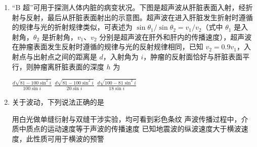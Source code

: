 \documentclass[\gkver]{gaokaozhenti}
\begin{document}
\begin{enumerate}
\fourchoices[answer=A]
{$2.0\UV$}
{$9.0\UV$}
{$12.7\UV$}
{$144.0\UV$}


\item
“B 超”可用于探测人体内脏的病变状况。下图是超声波从肝脏表面入射，经折射与反射，最后从肝脏表面射出的示意图。超声波在进入肝脏发生折射时遵循的规律与光的折射规律类似，可表述为 $\sin\theta_{1}/\sin\theta_{2}=v_{1}/v_{2}$（式中 $\theta_{1}$ 是入射角，$\theta_{2}$ 是折射角，$v_{1}$、$v_{2}$ 分别是超声波在肝外和肝内的传播速度），超声波在肿瘤表面发生反射时遵循的规律与光的反射规律相同，已知 $v_{2}=0.9v_{1}$，入射点与出射点之间的距离是 $d$，入射角为 $i$，肿瘤的反射面恰好与肝脏表面平行，则肿瘤离肝脏表面的深度 $h$ 为

\onepicture[w=3.58cm]{}

{$\frac{d\sqrt{81-100\sin^{2}i}}{100\sin i}$}
{$\frac{d\sqrt{81-100\sin^{2}i}}{20\sin i}$}
{$\frac{d\sqrt{100-81\sin^{2}i}}{18\sin i}$}


\item
关于波动，下列说法正确的是

{用白光做单缝衍射与双缝干涉实验，均可看到彩色条纹}
{声波传播过程中，介质中质点的运动速度等于声波的传播速度}
{已知地震波的纵波速度大于横波速度，此性质可用于横波的预警}



\end{enumerate}
\end{document}
